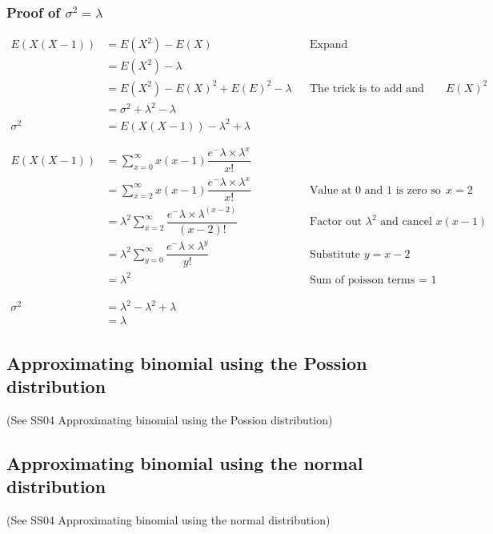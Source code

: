             \subsubsection{Proof of $\sigma^2=\lambda$}
                \begin{align*}
                    E(X(X-1)) &= E(X^2) - E(X)                  && \text{Expand}\\
                              &= E(X^2) - \lambda                    \\
                              &= E(X^2) - E(X)^2 + E(E)^2 - \lambda  && \text{The trick is to add and subtract $E(X)^2$}\\
                              &= \sigma^2 + \lambda^2 - \lambda     \\            
                     \sigma^2 &= E(X(X-1)) - \lambda^2 + \lambda
                    \\\\\\
                    E(X(X-1)) &= \sum^\infty_{x=0} x(x-1) \dfrac{e^-\lambda \times \lambda^x}{x!} \\
                              &= \sum^\infty_{x=2} x(x-1) \dfrac{e^-\lambda \times \lambda^x}{x!} && \text{Value at 0 and 1 is zero so lower limit becomes $x=2$}\\
                              &= \lambda^2 \sum^\infty_{x=2} \dfrac{e^-\lambda \times \lambda^{(x-2)}}{(x-2)!} && \text{Factor out $\lambda^2$ and cancel $x(x-1)$} \\
                              &= \lambda^2 \sum^\infty_{y=0} \dfrac{e^-\lambda \times \lambda^y}{y!} && \text{Substitute $y=x-2$} \\
                              &= \lambda^2 && \text{Sum of poisson terms = 1}
                    \\\\\\
                    \sigma^2 &= \lambda^2 - \lambda^2 + \lambda \\
                             &= \lambda
                \end{align*}

        \subsection{Approximating binomial using the Possion distribution}
            (See SS04 Approximating binomial using the Possion distribution)

        \subsection{Approximating binomial using the normal distribution}
            (See SS04 Approximating binomial using the normal distribution)

